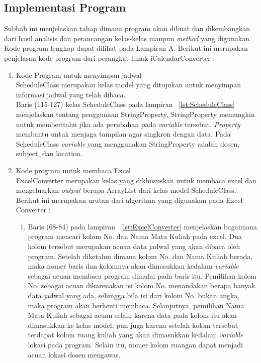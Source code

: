 \subsection{Implementasi Program}
Subbab ini menjelaskan tahap dimana program akan dibuat dan dikembangkan dari hasil analisis dan perancangan kelas-kelas maupun \textit{method} yang digunakan. Kode program lengkap dapat dilihat pada Lampiran A. 
Berikut ini merupakan penjelasan kode program dari perangkat lunak iCalendarConverter :
\begin{enumerate}
	\item Kode Program untuk menyimpan jadwal \\
	ScheduleClass merupakan kelas model yang ditujukan untuk menyimpan informasi jadwal yang telah dibaca.\\
	Baris (115-127) kelas ScheduleClass pada lampiran ~\ref{lst:ScheduleClass} menjelaskan tentang penggunaan StringProperty, 
	StringProperty memungkin untuk memberitahu jika ada perubahan pada \textit{variable} tersebut. \textit{Property} membantu untuk menjaga tampilan agar singkron dengan data. Pada ScheduleClass \textit{variable} yang menggunakan StringProperty adalah dosen, subject, dan location.	
	\item Kode program untuk membaca Excel \\
	ExcelConverter merupakan kelas yang dikhususkan untuk membaca excel dan mengeluarkan \textit{output} berupa ArrayList dari kelas model ScheduleClass.\\
	Berikut ini merupakan urutan dari algoritma yang digunakan pada Excel Converter :
\begin{enumerate}
		\item Baris (68-84) pada lampiran ~\ref{lst:ExcelConverter} menjelaskan bagaimana program mencari kolom No. dan Nama Mata Kuliah pada excel. Dua kolom tersebut merupakan acuan data jadwal yang akan dibaca oleh program. Setelah diketahui dimana kolom No. dan Nama Kuliah berada, maka nomer baris dan kolomnya akan dimasukkan kedalam \textit{variable} sebagai acuan membaca program dimulai pada baris itu. Pemilihan kolom No. sebagai acuan dikarenakan isi kolom No. menandakan berapa banyak data jadwal yang ada, sehingga bila isi dari kolom No. bukan angka, maka program akan berhenti membaca. Selanjutnya, pemilihan Nama Mata Kuliah sebagai acuan selain karena data pada kolom itu akan dimasukkan ke kelas model, pun juga karena setelah kolom tersebut terdapat kolom ruang kuliah yang akan dimasukkan kedalam \textit{variable} lokasi pada program.
		Selain itu, nomer kolom ruangan dapat menjadi acuan lokasi dosen mengawas.

\end{enumerate}
\end{enumerate}
